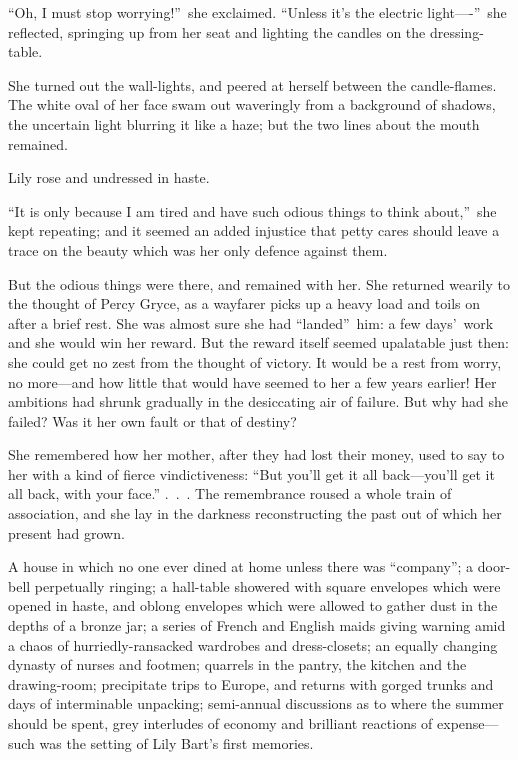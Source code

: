 \documentclass[12pt,a4paper]{book}
\begin{document}
``Oh, I must stop worrying!''\ she exclaimed. ``Unless it's the
electric light----''\ she reflected, springing up from her seat and
lighting the candles on the dressing-table.





She turned out the wall-lights, and peered at herself between the
candle-flames. The white oval of her face swam out waveringly
from a background of shadows, the uncertain light blurring it
like a haze; but the two lines about the mouth remained.





Lily rose and undressed in haste.





``It is only because I am tired and have such odious things to
think about,''\ she kept repeating; and it seemed an added
injustice that petty cares should leave a trace on the beauty
which was her only defence against them.





But the odious things were there, and remained with her. She
returned wearily to the thought of Percy Gryce, as a wayfarer
picks up a heavy load and toils on after a brief rest. She was
almost sure she had ``landed''\ him: a few days'\ work and she would
win her reward. But the reward itself seemed upalatable
just then: she could get no zest from the thought of victory. It
would be a rest from worry, no more---and how little that would
have seemed to her a few years earlier! Her ambitions had shrunk
gradually in the desiccating air of failure. But why had she
failed? Was it her own fault or that of destiny?





She remembered how her mother, after they had lost their money,
used to say to her with a kind of fierce vindictiveness: ``But
you'll get it all back---you'll get it all back, with your face.''
.\ .\ . The remembrance roused a whole train of association, and
she lay in the darkness reconstructing the past out of which her
present had grown.





A house in which no one ever dined at home unless there was
``company''; a door-bell perpetually ringing; a hall-table showered
with square envelopes which were opened in haste, and oblong
envelopes which were allowed to gather dust in the depths of a
bronze jar; a series of French and English maids giving warning
amid a chaos of hurriedly-ransacked wardrobes and dress-closets;
an equally changing dynasty of nurses and footmen; quarrels in
the pantry, the kitchen and the drawing-room; precipitate trips
to Europe, and returns with gorged trunks and days of
interminable unpacking; semi-annual discussions as to where the
summer should be spent, grey interludes of economy and brilliant
reactions of expense---such was the setting of Lily Bart's first
memories.
\end{document}
